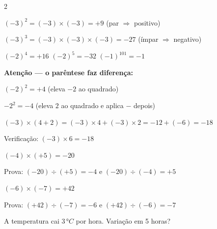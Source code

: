\documentclass[12pt,twoside]{article}
\begin{document}
\begin{multicols}{2}


$(-3)^2 = (-3)\times(-3) = +9$ \quad (par $\Rightarrow$ positivo)

$(-3)^3 = (-3)\times(-3)\times(-3) = -27$ \quad (ímpar $\Rightarrow$ negativo)

$(-2)^4 = +16$ \quad $(-2)^5 = -32$ \quad $(-1)^{101} = -1$

\vspace{4pt}
\textbf{Atenção — o parêntese faz diferença:}

$(-2)^2 = +4$ \quad (eleva $-2$ ao quadrado)

$-2^2 = -4$ \quad (eleva $2$ ao quadrado e aplica $-$ depois)




$(-3)\times(4+2) = (-3)\times4 + (-3)\times2 = -12+(-6) = -18$

Verificação: $(-3)\times6 = -18$ \checkmark




$(-4)\times(+5) = -20$

Prova: $(-20)\div(+5) = -4$ \checkmark \quad e \quad $(-20)\div(-4) = +5$ \checkmark

\vspace{4pt}
$(-6)\times(-7) = +42$

Prova: $(+42)\div(-7) = -6$ \checkmark \quad e \quad $(+42)\div(-6) = -7$ \checkmark



A temperatura cai $3\,°C$ por hora. Variação em 5 horas?


\end{multicols}
\end{document}
